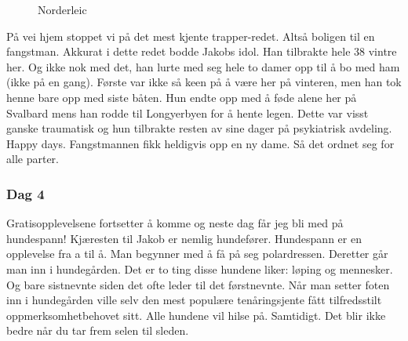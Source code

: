 \begin{figure}[H]
	\centering
\noindent{}	
	\caption*{Norderleic}
\label{fig:båtis}
\end{figure}

På vei hjem stoppet vi på
det mest kjente trapper-redet. Altså boligen til en fangstman. Akkurat
i dette redet bodde Jakobs idol. Han tilbrakte hele 38 vintre her. Og ikke nok med det, han lurte med seg hele to damer opp
til å bo med ham (ikke på en gang). Første var ikke så keen på å være her på vinteren,
men han tok henne bare opp med siste båten. Hun endte opp med å føde
alene her på Svalbard mens han rodde til Longyerbyen for å hente
legen. Dette var visst ganske traumatisk og hun tilbrakte resten av
sine dager på psykiatrisk avdeling. Happy days. Fangstmannen fikk
heldigvis opp en ny dame. Så det ordnet seg for alle parter.\\



\subsubsection{Dag 4}
Gratisopplevelsene fortsetter å komme og neste dag får jeg bli med på
hundespann! Kjæresten til Jakob er nemlig hundefører. Hundespann er en opplevelse fra a til å. Man begynner med å få på seg
polardressen. Deretter går man inn i hundegården. Det er to ting disse hundene liker:
løping
og mennesker. Og bare sistnevnte siden det ofte leder til det
førstnevnte. Når man setter foten inn i hundegården ville selv den
mest populære tenåringsjente fått
tilfredsstilt oppmerksomhetbehovet sitt. Alle hundene vil hilse på.
Samtidigt. Det blir ikke bedre når du tar frem selen til sleden.\\

